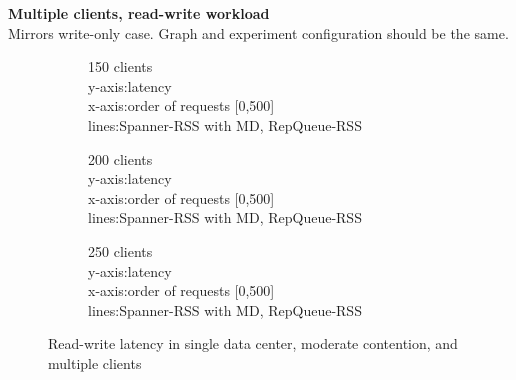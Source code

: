 \documentclass[letterpaper, 11pt]{article}
\begin{document}
\noindent \textbf{Multiple clients, read-write workload} \\
Mirrors write-only case. Graph and experiment configuration should be the same.
\begin{figure}[H]
  \centering
  \begin{subfigure}[t]{0.3\textwidth}
    \begin{tcolorbox}[width=\textwidth, sharp corners=all, frame empty]
      150 clients \\
    y-axis:latency\\
    x-axis:order of requests [0,500] \\
    lines:Spanner-RSS with MD, RepQueue-RSS
  \end{tcolorbox}
\end{subfigure}
\begin{subfigure}[t]{0.3\textwidth}
  \begin{tcolorbox}[width=\textwidth, sharp corners=all, frame empty]
    200 clients\\
    y-axis:latency\\
    x-axis:order of requests [0,500] \\
    lines:Spanner-RSS with MD, RepQueue-RSS
  \end{tcolorbox}
\end{subfigure}
\begin{subfigure}[t]{0.3\textwidth}
  \begin{tcolorbox}[width=\textwidth, sharp corners=all, frame empty]
    250 clients\\
    y-axis:latency\\
    x-axis:order of requests [0,500] \\
    lines:Spanner-RSS with MD, RepQueue-RSS
  \end{tcolorbox}
\end{subfigure}
\caption{Read-write latency in single data center, moderate contention, and multiple clients}
\end{figure}
\end{document}
